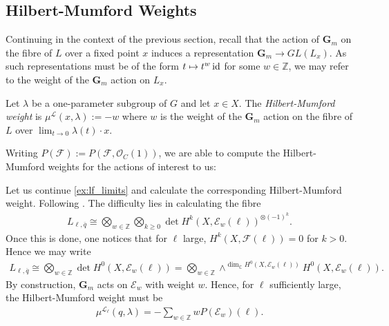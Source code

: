 \documentclass[12pt]{ociamthesis}  %
\begin{document}
\subsection{Hilbert-Mumford Weights}

Continuing in the context of the previous section, recall that the action
of $\mathbf G_m$ on the fibre of $L$ over a fixed point $x$ induces a
representation $\mathbf G_m\to GL(L_x)$. As such representations must
be of the form $t \mapsto t^w\operatorname{id}$ for some $w\in\mathbb Z$,
we may refer to the weight of the $\mathbf G_m$ action on $L_x$.

\begin{definition}
  Let $\lambda$ be a one-parameter subgroup of $G$ and let
  $x\in X$. The \emph{Hilbert-Mumford weight}
  is $\mu^{\mathscr L}(x,\lambda) := -w$ where $w$ is the weight of the
  $\mathbf G_m$ action on the fibre of $L$ over $\lim_{t\to 0}\lambda(t)\cdot x$.
\end{definition}

Writing $P(\mathscr F) := P(\mathscr F,\mathscr O_C(1))$, we are
able to compute the Hilbert-Mumford weights for the actions of
interest to us:

\begin{example}\label{ex:lf_hm_weight}
  Let us continue \ref{ex:lf_limits} and calculate the corresponding
  Hilbert-Mumford weight. Following \cite[Lemma 8.52]{hoskins2016}.
  The difficulty lies
  in calculating the fibre
  \begin{align*}
    L_{\ell,\overline q} \cong \bigotimes_{w\in\mathbb Z}\bigotimes_{k\geq 0} \det H^k(X,\mathscr E_w(\ell))^{\otimes(-1)^k}.
  \end{align*}
  Once this is done, one notices that for $\ell$ large,
  $H^k(X,\mathscr F(\ell))=0$ for $k>0$. Hence we may write
  \begin{align*}
    L_{\ell,\overline q}
    \cong \bigotimes_{w\in\mathbb Z}\det H^0(X,\mathscr E_w(\ell))
    = \bigotimes_{w\in\mathbb Z}\wedge^{\dim_{\mathbb C}H^0(X,\mathscr E_w(\ell))} H^0(X,\mathscr E_w(\ell)).
  \end{align*}
  By construction, $\mathbf G_m$ acts on $\mathscr E_w$ with weight
  $w$. Hence, for $\ell$ sufficiently large, the Hilbert-Mumford
  weight must be
  \begin{align*}
    \mu^{\mathscr L_\ell}(q,\lambda) =
    -\sum_{w\in\mathbb Z} w P(\mathscr E_w)(\ell).
  \end{align*}
\end{example}
\end{document}
